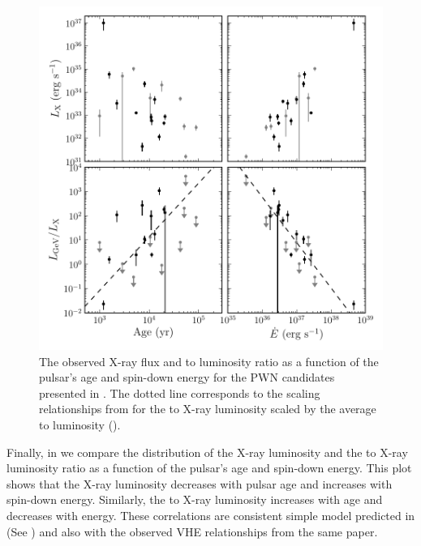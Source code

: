 \begin{figure}[htbp]
  \centering
  \includegraphics{chapters/population_study/figures/pwn_age_edot_vs_l_xray.pdf}
  \caption{The observed X-ray flux and \gev to \tev luminosity ratio as
  a function of the pulsar's age and spin-down energy for the \ac{PWN}
  candidates presented in .
  The dotted line corresponds to the scaling relationships from
  \cite{mattana_2009_evolution-gamma-} for the \tev to X-ray luminosity
  scaled by the average \gev to \tev luminosity (\MeanLuminosityRatio).}
\end{figure}

Finally, in  we compare the distribution
of the X-ray luminosity and the \gev to X-ray luminosity ratio as a
function of the pulsar's age and spin-down energy.  This plot shows
that the X-ray luminosity decreases with pulsar age and increases with
spin-down energy. Similarly, the \gev to X-ray luminosity increases
with age and decreases with energy.  These correlations are consistent
simple model predicted in \cite{mattana_2009_evolution-gamma-} (See
) and also with the observed \ac{VHE} relationships
from the same paper.


